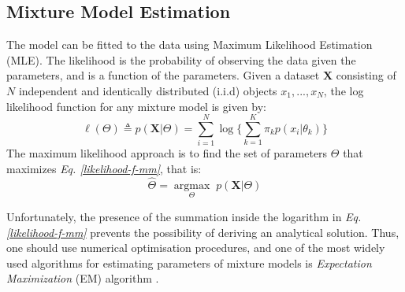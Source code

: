 \subsection{Mixture Model Estimation} \label{mixt-model-estimation-l-subsect}
The model can be fitted to the data using Maximum Likelihood Estimation (MLE). The likelihood is the probability of observing the data given the parameters, and is a function of the parameters. Given a dataset $\mathbf{X}$ consisting of $N$ independent and identically distributed (i.i.d) objects $x_{1}, ..., x_{N}$, the log likelihood function for any mixture model is given by:
\begin{equation} \label{likelihood-f-mm}
	\ell(\Theta) \triangleq p(\mathbf{X}|\Theta) = \sum_{i=1}^{N} \log \bigg\lbrace \sum_{k=1}^{K}\pi_{k}p(x_{i}|\theta_{k})\bigg\rbrace
\end{equation}
The maximum likelihood approach is to find the set of parameters $\Theta$ that maximizes \emph{Eq. \ref{likelihood-f-mm}}, that is:
\begin{equation} \label{MLE-f-mm}
	\hat{\Theta} =  \underset{\Theta}{\operatorname{argmax}} \; p(\mathbf{X}|\Theta)
\end{equation}

Unfortunately, the presence of the summation inside the logarithm in \emph{Eq. \ref{likelihood-f-mm}} prevents the possibility of deriving an analytical solution. Thus, one should use numerical optimisation procedures, and one of the most widely used algorithms for estimating parameters of mixture models is \emph{Expectation Maximization} (EM) algorithm \citep{Dempster1977}. 